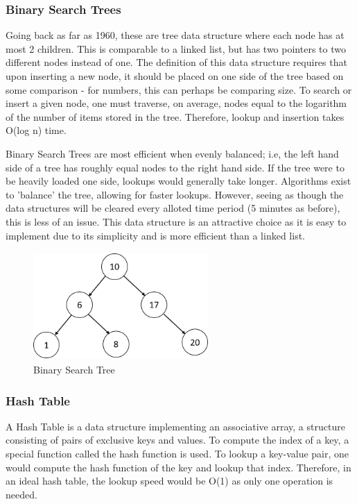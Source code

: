 \documentclass[twocolumn,10pt]{asme2ej}
\begin{document}
\subsubsection{Binary Search Trees}
Going back as far as 1960, these are tree data structure where each node has at most 2 children. This is comparable to a linked list, but has two pointers to two different nodes instead of one. The definition of this data structure requires that upon inserting a new node, it should be placed on one side of the tree based on some comparison - for numbers, this can perhaps be comparing size. To search or insert a given node, one must traverse, on average, nodes equal to the logarithm of the number of items stored in the tree. Therefore, lookup and insertion takes O(log n) time.

Binary Search Trees are most efficient when evenly balanced; i.e, the left hand side of a tree has roughly equal nodes to the right hand side. If the tree were to be heavily loaded one side, lookups would generally take longer. Algorithms exist to 'balance' the tree, allowing for faster lookups. However, seeing as though the data structures will be cleared every alloted time period (5 minutes as before), this is less of an issue. This data structure is an attractive choice as it is easy to implement due to its simplicity and is more efficient than a linked list. 
\begin{figure}[h]
	\begin{center}
		\includegraphics[width=6.68cm, height=4.11cm]{figures/bst}
	\end{center}
	\caption{Binary Search Tree}
	\label{figure_bst} 
\end{figure}

\subsubsection{Hash Table}
A Hash Table is a data structure implementing an associative array, a structure consisting of pairs of exclusive keys and values. To compute the index of a key, a special function called the hash function is used. To lookup a key-value pair, one would compute the hash function of the key and lookup that index. Therefore, in an ideal hash table, the lookup speed would be O(1) as only one operation is needed. 
\end{document}
